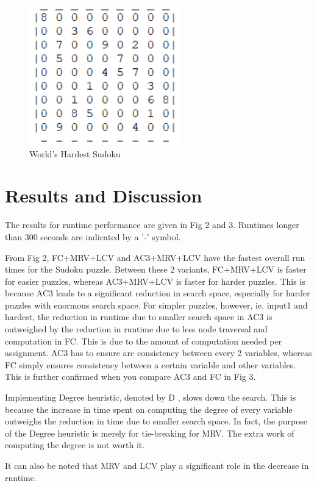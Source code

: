 \documentclass[runningheads]{llncs}
\begin{document}
\begin{figure}
\centering
\includegraphics[scale=0.9]{hardest_sudoku.png}
\caption{World's Hardest Sudoku}
\label{Figure 1}
\end{figure}

\section{Results and Discussion}

 The results for runtime performance are given in Fig 2 and 3. Runtimes longer than 300 seconds are indicated by a '-' symbol.

From Fig 2, FC+MRV+LCV and AC3+MRV+LCV have the fastest overall run times for the Sudoku puzzle. Between these 2 variants, FC+MRV+LCV is faster for easier puzzles, whereas AC3+MRV+LCV is faster for harder puzzles. This is because AC3 leads to a significant reduction in search space, especially for harder puzzles with enormous search space. For simpler puzzles, however, ie. input1 and hardest, the reduction in runtime due to smaller search space in AC3 is outweighed by the reduction in runtime due to less node traversal and computation in FC. This is due to the amount of computation needed per assignment. AC3 has to ensure arc consistency between every 2 variables, whereas FC simply ensures consistency between a certain variable and other variables. This is further confirmed when you compare AC3 and FC in Fig 3.

Implementing Degree heuristic, denoted by D , slows down the search. This is because the increase in time spent on computing the degree of every variable outweighs the reduction in time due to smaller search space. In fact, the purpose of the Degree heuristic is merely for tie-breaking for MRV. The extra work of computing the degree is not worth it. 

It can also be noted that MRV and LCV play a significant role in the decrease in runtime.  
\end{document}
